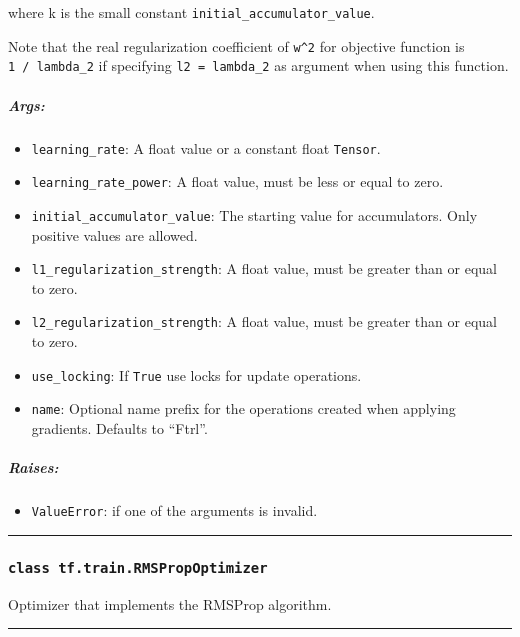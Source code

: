 where k is the small constant \texttt{initial\_accumulator\_value}.

Note that the real regularization coefficient of
\texttt{\textbar{}w\textbar{}\^{}2} for objective function is
\texttt{1\ /\ lambda\_2} if specifying \texttt{l2\ =\ lambda\_2} as
argument when using this function.

\subparagraph{Args: }\label{args-9}

\begin{itemize}
\tightlist
\item
  \texttt{learning\_rate}: A float value or a constant float
  \texttt{Tensor}.
\item
  \texttt{learning\_rate\_power}: A float value, must be less or equal
  to zero.
\item
  \texttt{initial\_accumulator\_value}: The starting value for
  accumulators. Only positive values are allowed.
\item
  \texttt{l1\_regularization\_strength}: A float value, must be greater
  than or equal to zero.
\item
  \texttt{l2\_regularization\_strength}: A float value, must be greater
  than or equal to zero.
\item
  \texttt{use\_locking}: If \texttt{True} use locks for update
  operations.
\item
  \texttt{name}: Optional name prefix for the operations created when
  applying gradients. Defaults to ``Ftrl''.
\end{itemize}

\subparagraph{Raises: }\label{raises-5}

\begin{itemize}
\tightlist
\item
  \texttt{ValueError}: if one of the arguments is invalid.
\end{itemize}

\begin{center}\rule{0.5\linewidth}{\linethickness}\end{center}

\subsubsection{\texorpdfstring{\texttt{class\ tf.train.RMSPropOptimizer}
}{class tf.train.RMSPropOptimizer }}\label{class-tf.train.rmspropoptimizer}

Optimizer that implements the RMSProp algorithm.

\begin{center}\rule{0.5\linewidth}{\linethickness}\end{center}

